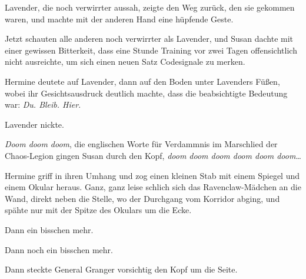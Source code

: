 Lavender, die noch verwirrter aussah, zeigte den Weg zurück, den sie gekommen waren, und machte mit der anderen Hand eine hüpfende Geste.

Jetzt schauten alle anderen noch verwirrter als Lavender, und Susan dachte mit einer gewissen Bitterkeit, dass eine Stunde Training vor zwei Tagen offensichtlich nicht ausreichte, um sich einen neuen Satz Codesignale zu merken.

Hermine deutete auf Lavender, dann auf den Boden unter Lavenders Füßen, wobei ihr Gesichtsausdruck deutlich machte, dass die beabsichtigte Bedeutung war: \emph{Du. Bleib. Hier}.

Lavender nickte.

\emph{Doom doom doom}, die englischen Worte für Verdammnis im Marschlied der Chaos-Legion gingen Susan durch den Kopf, \emph{doom doom doom doom doom doom}…%

Hermine griff in ihren Umhang und zog einen kleinen Stab mit einem Spiegel und einem Okular heraus. Ganz, ganz leise schlich sich das Ravenclaw-Mädchen an die Wand, direkt neben die Stelle, wo der Durchgang vom Korridor abging, und spähte nur mit der Spitze des Okulars um die Ecke.

Dann ein bisschen mehr.

Dann noch ein bisschen mehr.

Dann steckte General Granger vorsichtig den Kopf um die Seite.

